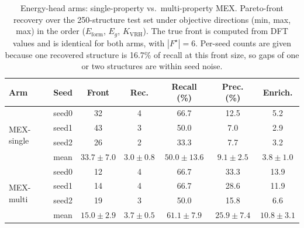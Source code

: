 \begin{table}[htbp]
\renewcommand{\arraystretch}{1.2}
\setlength{\tabcolsep}{4pt}
\caption{Energy-head arms: single-property vs.\ multi-property MEX. Pareto-front recovery over the 250-structure test set under objective directions (min, max, max) in the order ($E_\mathrm{form}$, $E_g$, $K_\mathrm{VRH}$). The true front is computed from DFT values and is identical for both arms, with $|F^\star|{=}6$. Per-seed counts are given because one recovered structure is 16.7\% of recall at this front size, so gaps of one or two structures are within seed noise.}
\label{tab:pareto_arms_mex}
\centering
\footnotesize
\begin{tabular}{@{}llccccc@{}}
\hline\hline
\textbf{Arm} & \textbf{Seed} & \textbf{Front} & \textbf{Rec.} & \textbf{Recall (\%)} & \textbf{Prec. (\%)} & \textbf{Enrich.} \\
\hline
\multirow{4}{*}{MEX-single}
  & seed0 & 32 & 4 & 66.7 & 12.5 & 5.2 \\
  & seed1 & 43 & 3 & 50.0 & 7.0 & 2.9 \\
  & seed2 & 26 & 2 & 33.3 & 7.7 & 3.2 \\
  & mean & $33.7 \pm 7.0$ & $3.0 \pm 0.8$ & $50.0 \pm 13.6$ & $9.1 \pm 2.5$ & $3.8 \pm 1.0$ \\
\hline
\multirow{4}{*}{MEX-multi}
  & seed0 & 12 & 4 & 66.7 & 33.3 & 13.9 \\
  & seed1 & 14 & 4 & 66.7 & 28.6 & 11.9 \\
  & seed2 & 19 & 3 & 50.0 & 15.8 & 6.6 \\
  & mean & $15.0 \pm 2.9$ & $3.7 \pm 0.5$ & $61.1 \pm 7.9$ & $25.9 \pm 7.4$ & $10.8 \pm 3.1$ \\
\hline\hline
\end{tabular}
\end{table}
